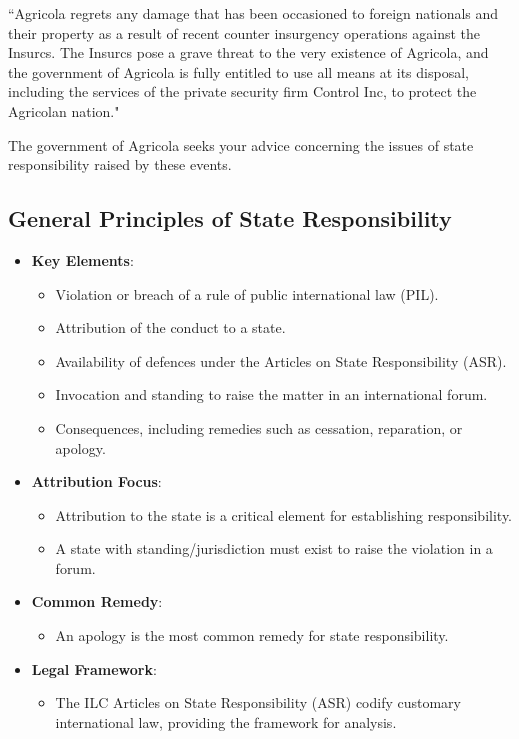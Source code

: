 \begin{tutorialquestion}
    \vspace{\baselineskip}
    
    ``Agricola regrets any damage that has been occasioned to foreign nationals and their property as a result of recent counter insurgency operations against the Insurcs. The Insurcs pose a grave threat to the very existence of Agricola, and the government of Agricola is fully entitled to use all means at its disposal, including the services of the private security firm Control Inc, to protect the Agricolan nation."

    \vspace{\baselineskip}
    
    The government of Agricola seeks your advice concerning the issues of state responsibility raised by these events.

\end{tutorialquestion}

\subsection{General Principles of State Responsibility}
\begin{itemize}
    \item \textbf{Key Elements}:
    \begin{itemize}
        \item Violation or breach of a rule of public international law (PIL).
        \item Attribution of the conduct to a state.
        \item Availability of defences under the Articles on State Responsibility (ASR).
        \item Invocation and standing to raise the matter in an international forum.
        \item Consequences, including remedies such as cessation, reparation, or apology.
    \end{itemize}
    \item \textbf{Attribution Focus}:
    \begin{itemize}
        \item Attribution to the state is a critical element for establishing responsibility.
        \item A state with standing/jurisdiction must exist to raise the violation in a forum.
    \end{itemize}
    \item \textbf{Common Remedy}:
    \begin{itemize}
        \item An apology is the most common remedy for state responsibility.
    \end{itemize}
    \item \textbf{Legal Framework}:
    \begin{itemize}
        \item The ILC Articles on State Responsibility (ASR) codify customary international law, providing the framework for analysis.
    \end{itemize}
\end{itemize}

